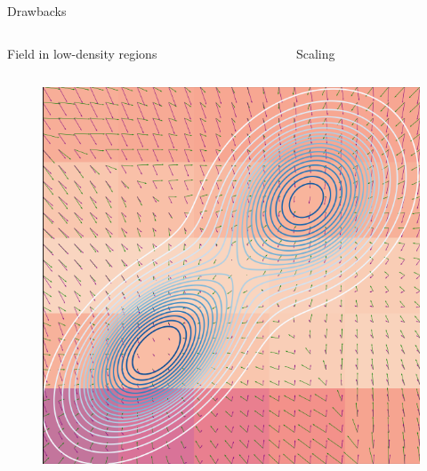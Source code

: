 \documentclass[aspectratio=169,xcolor=dvipsnames]{beamer}
\begin{document}
\begin{frame}{Drawbacks}
  \pause
  \begin{columns}
    \begin{column}{0.4\textwidth}
      \centering
      Field in low-density regions
    \end{column}
    \begin{column}{0.6\textwidth}
      \centering
      Scaling
    \end{column}
  \end{columns}

  \begin{columns}
    \begin{column}{0.4\textwidth}
      \centering
      \begin{figure}
        \centering
        \includegraphics[height=0.32\textheight]{figs/gen/score_field_training_0.png}
      \end{figure}


\end{column}
\end{columns}
\end{frame}
\end{document}
